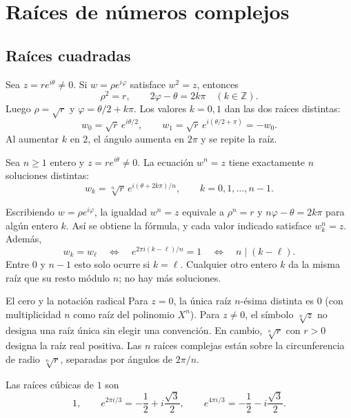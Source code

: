 \section{Raíces de números complejos}
\subsection{Raíces cuadradas}
Sea $z=re^{i\theta}\neq0$. Si $w=\rho e^{i\varphi}$ satisface $w^2=z$,
entonces
\[
\rho^2=r,\qquad 2\varphi-\theta=2k\pi\quad(k\in\mathbb Z).
\]
Luego $\rho=\sqrt r$ y $\varphi=\theta/2+k\pi$. Los valores $k=0,1$
dan las dos raíces distintas:
\[
w_0=\sqrt r\,e^{i\theta/2},\qquad
w_1=\sqrt r\,e^{i(\theta/2+\pi)}=-w_0.
\]
Al aumentar $k$ en $2$, el ángulo aumenta en $2\pi$ y se repite la raíz.

\begin{proposicion}[{title={Raíces $n$-ésimas}}]
Sea $n\geq1$ entero y $z=re^{i\theta}\neq0$. La ecuación $w^n=z$
tiene exactamente $n$ soluciones distintas:
\[
w_k=\sqrt[n]{r}\,e^{i(\theta+2k\pi)/n},
\qquad k=0,1,\dots,n-1.
\]
\end{proposicion}
\begin{demostracion}
Escribiendo $w=\rho e^{i\varphi}$, la igualdad $w^n=z$ equivale a
$\rho^n=r$ y $n\varphi-\theta=2k\pi$ para algún entero $k$.
Así se obtiene la fórmula, y cada valor indicado satisface $w_k^n=z$.
Además,
\[
w_k=w_\ell\quad\Longleftrightarrow\quad
 e^{2\pi i(k-\ell)/n}=1
\quad\Longleftrightarrow\quad n\mid(k-\ell).
\]
Entre $0$ y $n-1$ esto solo ocurre si $k=\ell$. Cualquier otro entero
$k$ da la misma raíz que su resto módulo $n$; no hay más soluciones.
\end{demostracion}

\begin{nota}{El cero y la notación radical}
Para $z=0$, la única raíz $n$-ésima distinta es $0$ (con multiplicidad
$n$ como raíz del polinomio $X^n$). Para $z\neq0$, el símbolo
$\sqrt[n]{z}$ no designa una raíz única sin elegir una convención.
En cambio, $\sqrt[n]{r}$ con $r>0$ designa la raíz real positiva.
Las $n$ raíces complejas están sobre la circunferencia de radio
$\sqrt[n]{r}$, separadas por ángulos de $2\pi/n$.
\end{nota}

\begin{ejemplo}
Las raíces cúbicas de $1$ son
\[
1,\qquad e^{2\pi i/3}=-\frac12+i\frac{\sqrt3}{2},\qquad
 e^{4\pi i/3}=-\frac12-i\frac{\sqrt3}{2}.
\]
\end{ejemplo}

